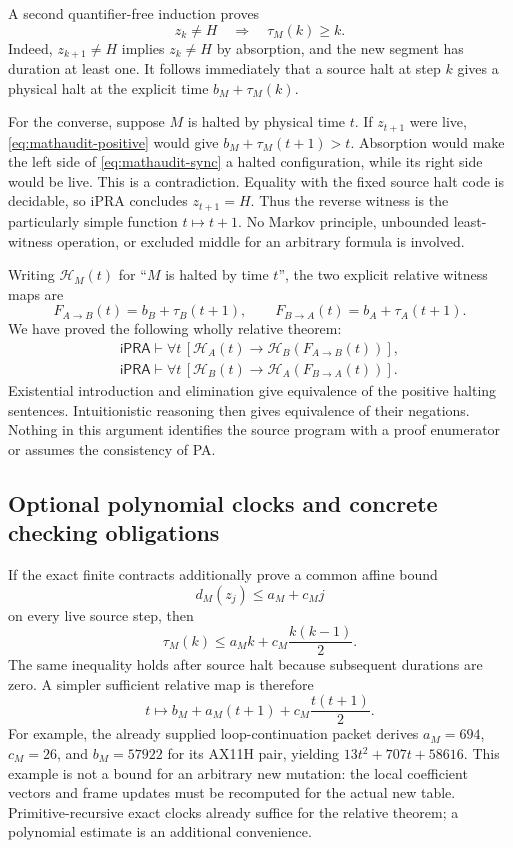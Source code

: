 A second quantifier-free induction proves
\[
 z_k\ne H\quad\Longrightarrow\quad\tau_M(k)\ge k.
 \tag{P}\label{eq:mathaudit-positive}
\]
Indeed, $z_{k+1}\ne H$ implies $z_k\ne H$ by absorption, and the new
segment has duration at least one.  It follows immediately that a source
halt at step $k$ gives a physical halt at the explicit time
$b_M+\tau_M(k)$.

For the converse, suppose $M$ is halted by physical time $t$.  If
$z_{t+1}$ were live, \eqref{eq:mathaudit-positive} would give
$b_M+\tau_M(t+1)>t$.  Absorption would make the left side of
\eqref{eq:mathaudit-sync} a halted configuration, while its right side
would be live.  This is a contradiction.  Equality with the fixed source
halt code is decidable, so iPRA concludes $z_{t+1}=H$.  Thus the reverse
witness is the particularly simple function $t\mapsto t+1$.
No Markov principle, unbounded least-witness operation, or excluded middle
for an arbitrary formula is involved.

Writing $\mathcal H_M(t)$ for ``$M$ is halted by time $t$'', the two
explicit relative witness maps are
\[
 F_{A\to B}(t)=b_B+\tau_B(t+1),\qquad
 F_{B\to A}(t)=b_A+\tau_A(t+1).
\]
We have proved the following wholly relative theorem:
\[
\boxed{\begin{gathered}
 \mathsf{iPRA}\vdash
 \forall t\,[\mathcal H_A(t)\to\mathcal H_B(F_{A\to B}(t))],\\
 \mathsf{iPRA}\vdash
 \forall t\,[\mathcal H_B(t)\to\mathcal H_A(F_{B\to A}(t))].
\end{gathered}}
\]
Existential introduction and elimination give equivalence of the positive
halting sentences.  Intuitionistic reasoning then gives equivalence of
their negations.  Nothing in this argument identifies the source program
with a proof enumerator or assumes the consistency of PA.

\subsection{Optional polynomial clocks and concrete checking obligations}

If the exact finite contracts additionally prove a common affine bound
\[
 d_M(z_j)\le a_M+c_Mj
\]
on every live source step, then
\[
 \tau_M(k)\le a_Mk+c_M\frac{k(k-1)}2.
\]
The same inequality holds after source halt because subsequent durations
are zero.  A simpler sufficient relative map is therefore
\[
 t\longmapsto b_M+a_M(t+1)+c_M\frac{t(t+1)}2.
\]
For example, the already supplied loop-continuation packet derives
$a_M=694$, $c_M=26$, and $b_M=57922$ for its AX11H pair, yielding
$13t^2+707t+58616$.  This example is not a bound for an arbitrary new
mutation: the local coefficient vectors and frame updates must be
recomputed for the actual new table.  Primitive-recursive exact clocks
already suffice for the relative theorem; a polynomial estimate is an
additional convenience.

